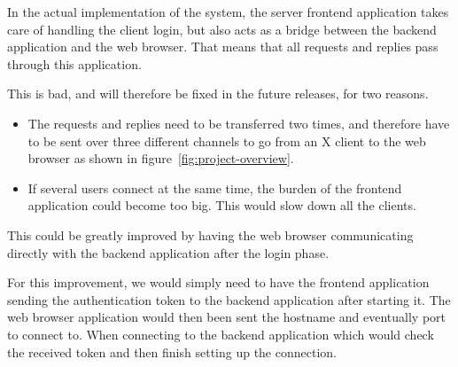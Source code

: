 In the actual implementation of the system, the server frontend application takes care of 
handling the client login, but also acts as a bridge between the backend application and the 
web browser. That means that all requests and replies pass through this application.

This is bad, and will therefore be fixed in the future releases, for two reasons.
\begin{itemize}
\item The requests and replies need to be transferred two times, and therefore have to 
  be sent over three different channels to go from an X client to the web browser as shown 
  in figure~\ref{fig:project-overview}.
\item If several users connect at the same time, the burden of the frontend 
  application could become too big. This would slow down all the clients.
\end{itemize}
This could be greatly improved by having the web browser communicating 
directly with the backend application after the login phase.

For this improvement, we would simply need to have the frontend application 
sending the authentication token to the backend application after starting it.
The web browser application would then been sent the hostname and eventually port 
to connect to. When connecting to the backend application which would check the 
received token and then finish setting up the connection.

